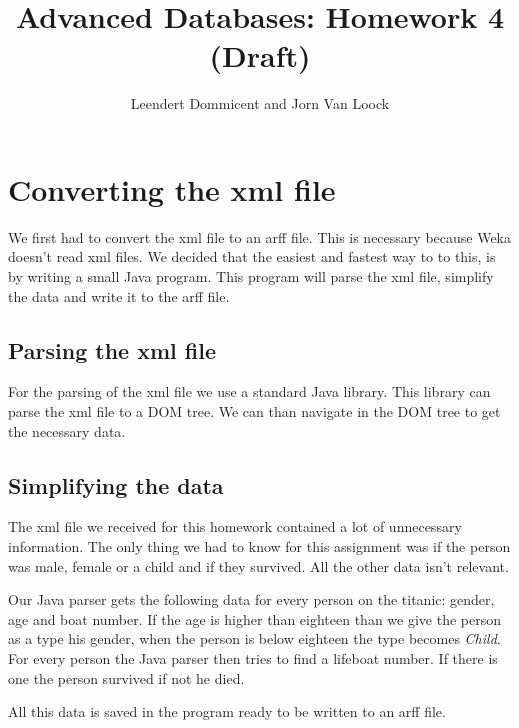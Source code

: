 \documentclass[a4]{article}
\title{Advanced Databases: Homework 4  (Draft)}
\author{Leendert Dommicent and Jorn Van Loock}
\begin{document}
\maketitle
\setlength{\parskip}{5pt}
\setlength{\parindent}{0pt}
\section{Converting the xml file}
We first had to convert the xml file to an arff file. This is necessary because Weka doesn't read xml files. We decided that the easiest and fastest way to to this, is by writing a small Java program. This program will parse the xml file, simplify the data and write it to the arff file.
\subsection{Parsing the xml file}
For the parsing of the xml file we use a standard Java library. This library can parse the xml file to a DOM tree. We can than navigate in the DOM tree to get the necessary data.
\subsection{Simplifying the data}
The xml file we received for this homework contained a lot of unnecessary information. The only thing we had to know for this assignment was if the person was male, female or a child and if they survived. All the other data isn't relevant.\par
Our Java parser gets the following data for every person on the titanic: gender, age and boat number. If the age is higher than eighteen than we give the person as a type his gender, when the person is below eighteen the type becomes \textit{Child}. For every person the Java parser then tries to find a lifeboat number. If there is one the person survived if not he died.\par
All this data is saved in the program ready to be written to an arff file.
\end{document}
